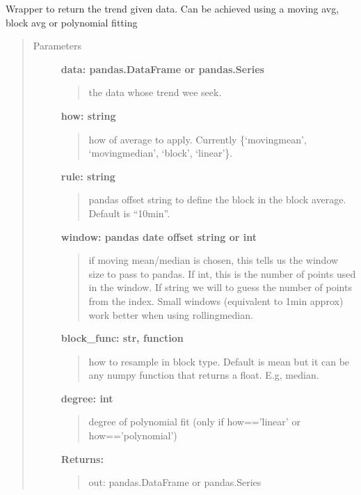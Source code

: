 \documentclass[a4paper,10pt,english]{sphinxmanual}
\begin{document}
\begin{fulllineitems}
\label{pymicra:pymicra.data.trend}
Wrapper to return the trend given data. Can be achieved using a moving avg, block avg or polynomial fitting
\begin{quote}\begin{description}
\item[{Parameters}] \leavevmode
\textbf{data: pandas.DataFrame or pandas.Series}
\begin{quote}

the data whose trend wee seek.
\end{quote}

\textbf{how: string}
\begin{quote}

how of average to apply. Currently \{`movingmean', `movingmedian', `block', `linear'\}.
\end{quote}

\textbf{rule: string}
\begin{quote}

pandas offset string to define the block in the block average. Default is ``10min''.
\end{quote}

\textbf{window: pandas date offset string or int}
\begin{quote}

if moving mean/median is chosen, this tells us the window size to pass to pandas. If int,
this is the number of points used in the window. If string we will to guess the number of
points from the index.
Small windows (equivalent to 1min approx) work better when using rollingmedian.
\end{quote}

\textbf{block\_func: str, function}
\begin{quote}

how to resample in block type. Default is mean but it can be any numpy function
that returns a float. E.g, median.
\end{quote}

\textbf{degree: int}
\begin{quote}

degree of polynomial fit (only if how=='linear' or how=='polynomial')
\end{quote}

\textbf{Returns:}
\begin{quote}

out: pandas.DataFrame or pandas.Series
\end{quote}

\end{description}\end{quote}

\end{fulllineitems}
\end{document}
